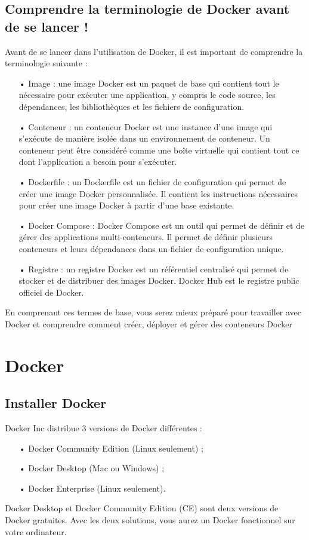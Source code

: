 \documentclass[12pt,a4paper]{article}
\begin{document}
\subsection{Comprendre la terminologie de Docker avant de se lancer !}
Avant de se lancer dans l'utilisation de Docker, il est important de comprendre la terminologie suivante :
\begin{itemize}
\item[•] Image : une image Docker est un paquet de base qui contient tout le nécessaire pour exécuter une application, y compris le code source, les dépendances, les bibliothèques et les fichiers de configuration.
\item[•] Conteneur : un conteneur Docker est une instance d'une image qui s'exécute de manière isolée dans un environnement de conteneur. Un conteneur peut être considéré comme une boîte virtuelle qui contient tout ce dont l'application a besoin pour s'exécuter.
\item[•] Dockerfile : un Dockerfile est un fichier de configuration qui permet de créer une image Docker personnalisée. Il contient les instructions nécessaires pour créer une image Docker à partir d'une base existante.
\item[•] Docker Compose : Docker Compose est un outil qui permet de définir et de gérer des applications multi-conteneurs. Il permet de définir plusieurs conteneurs et leurs dépendances dans un fichier de configuration unique.
\item[•] Registre : un registre Docker est un référentiel centralisé qui permet de stocker et de distribuer des images Docker. Docker Hub est le registre public officiel de Docker.
\end{itemize}

En comprenant ces termes de base, vous serez mieux préparé pour travailler avec Docker et comprendre comment créer, déployer et gérer des conteneurs Docker
    
\section{Docker}
\subsection{Installer Docker}
Docker Inc distribue 3 versions de Docker différentes :
\begin{itemize}
\item[•] Docker Community Edition (Linux seulement) ;
\item[•] Docker Desktop (Mac ou Windows) ;
\item[•] Docker Enterprise (Linux seulement).
\end{itemize}
Docker Desktop et Docker Community Edition (CE) sont deux versions de Docker gratuites. Avec les deux solutions, vous aurez un Docker fonctionnel sur votre ordinateur.
\end{document}
